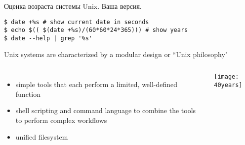 \begin{frame}[fragile]{Оценка возраста системы Unix.}
Ваша версия.
 \pause
    \begin{lstlisting}
$ date +%s # show current date in seconds
$ echo $(( $(date +%s)/(60*60*24*365))) # show years
$ date --help | grep '%s'
    \end{lstlisting}
\pause
Unix systems are characterized by a \alert{modular design} or ``Unix philosophy"
		\begin{columns}
\begin{itemize}
    \item simple tools that each perform a limited, well-defined function
    \item shell scripting and command language to combine the tools to perform complex workflows
    \item unified filesystem
\end{itemize}
            \texttt{[image: 40years]}
		\end{columns}
\end{frame}
